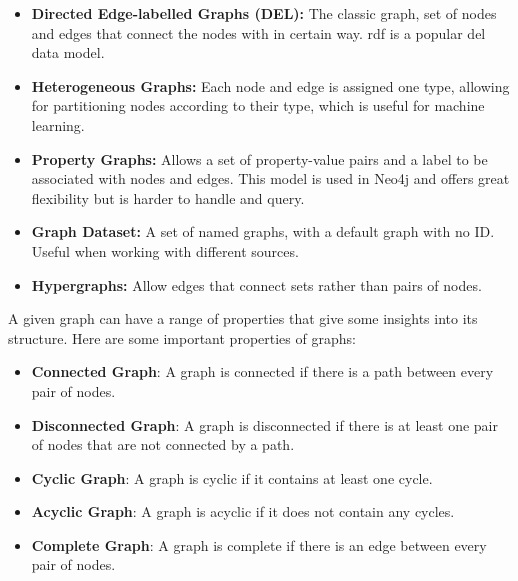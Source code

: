     \begin{itemize}
        \item \textbf{Directed Edge-labelled Graphs (DEL):} The classic graph, set of nodes and edges that connect the nodes with in certain way. \acrshort{rdf} is a popular \acrshort{del} data model.
        \item \textbf{Heterogeneous Graphs:} Each node and edge is assigned one type, allowing for partitioning nodes according to their type, which is useful for machine learning.
        \item \textbf{Property Graphs:} Allows a set of property-value pairs and a label to be associated with nodes and edges. This model is used in Neo4j and offers great flexibility but is harder to handle and query.
        \item \textbf{Graph Dataset:} A set of named graphs, with a default graph with no ID. Useful when working with different sources.
        \item \textbf{Hypergraphs:} Allow edges that connect sets rather than pairs of nodes.
    \end{itemize}

    A given graph can have a range of properties that give some insights into its structure. Here are some important properties of graphs:

    \begin{itemize}
        \item \textbf{Connected Graph}: A graph is connected if there is a path between every pair of nodes.
        \item \textbf{Disconnected Graph}: A graph is disconnected if there is at least one pair of nodes that are not connected by a path.
        \item \textbf{Cyclic Graph}: A graph is cyclic if it contains at least one cycle.
        \item \textbf{Acyclic Graph}: A graph is acyclic if it does not contain any cycles.
        \item \textbf{Complete Graph}: A graph is complete if there is an edge between every pair of nodes.
    \end{itemize}

